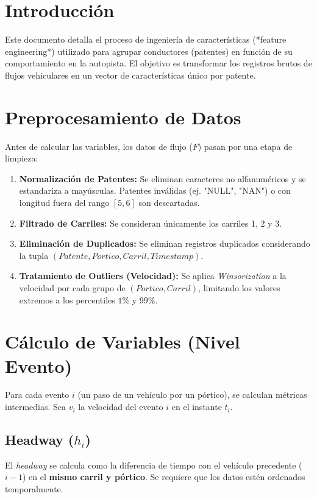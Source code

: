 \section{Introducción}
Este documento detalla el proceso de ingeniería de características (*feature engineering*) utilizado para agrupar conductores (patentes) en función de su comportamiento en la autopista. El objetivo es transformar los registros brutos de flujos vehiculares en un vector de características único por patente.

\section{Preprocesamiento de Datos}
Antes de calcular las variables, los datos de flujo ($F$) pasan por una etapa de limpieza:

\begin{enumerate}
    \item \textbf{Normalización de Patentes:} Se eliminan caracteres no alfanuméricos y se estandariza a mayúsculas. Patentes inválidas (ej. "NULL", "NAN") o con longitud fuera del rango $[5, 6]$ son descartadas.
    \item \textbf{Filtrado de Carriles:} Se consideran únicamente los carriles 1, 2 y 3.
    \item \textbf{Eliminación de Duplicados:} Se eliminan registros duplicados considerando la tupla $(Patente, Portico, Carril, Timestamp)$.
    \item \textbf{Tratamiento de Outliers (Velocidad):} Se aplica \textit{Winsorization} a la velocidad por cada grupo de $(Portico, Carril)$, limitando los valores extremos a los percentiles $1\%$ y $99\%$.
\end{enumerate}

\section{Cálculo de Variables (Nivel Evento)}
Para cada evento $i$ (un paso de un vehículo por un pórtico), se calculan métricas intermedias. Sea $v_i$ la velocidad del evento $i$ en el instante $t_i$.

\subsection{Headway ($h_i$)}
El \textit{headway} se calcula como la diferencia de tiempo con el vehículo precedente ($i-1$) en el \textbf{mismo carril y pórtico}. Se requiere que los datos estén ordenados temporalmente.

